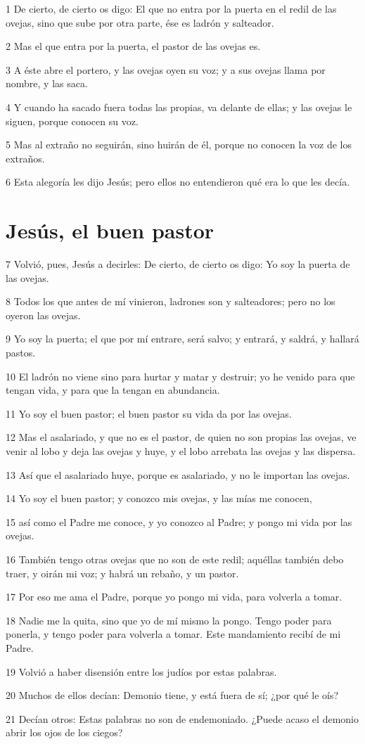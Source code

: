 \par 1 De cierto, de cierto os digo: El que no entra por la puerta en el redil de las ovejas, sino que sube por otra parte, ése es ladrón y salteador.
\par 2 Mas el que entra por la puerta, el pastor de las ovejas es.
\par 3 A éste abre el portero, y las ovejas oyen su voz; y a sus ovejas llama por nombre, y las saca.
\par 4 Y cuando ha sacado fuera todas las propias, va delante de ellas; y las ovejas le siguen, porque conocen su voz.
\par 5 Mas al extraño no seguirán, sino huirán de él, porque no conocen la voz de los extraños.
\par 6 Esta alegoría les dijo Jesús; pero ellos no entendieron qué era lo que les decía.

\section*{Jesús, el buen pastor}

\par 7 Volvió, pues, Jesús a decirles: De cierto, de cierto os digo: Yo soy la puerta de las ovejas.
\par 8 Todos los que antes de mí vinieron, ladrones son y salteadores; pero no los oyeron las ovejas.
\par 9 Yo soy la puerta; el que por mí entrare, será salvo; y entrará, y saldrá, y hallará pastos.
\par 10 El ladrón no viene sino para hurtar y matar y destruir; yo he venido para que tengan vida, y para que la tengan en abundancia.
\par 11 Yo soy el buen pastor; el buen pastor su vida da por las ovejas.
\par 12 Mas el asalariado, y que no es el pastor, de quien no son propias las ovejas, ve venir al lobo y deja las ovejas y huye, y el lobo arrebata las ovejas y las dispersa.
\par 13 Así que el asalariado huye, porque es asalariado, y no le importan las ovejas.
\par 14 Yo soy el buen pastor; y conozco mis ovejas, y las mías me conocen,
\par 15 así como el Padre me conoce, y yo conozco al Padre; y pongo mi vida por las ovejas.
\par 16 También tengo otras ovejas que no son de este redil; aquéllas también debo traer, y oirán mi voz; y habrá un rebaño, y un pastor.
\par 17 Por eso me ama el Padre, porque yo pongo mi vida, para volverla a tomar.
\par 18 Nadie me la quita, sino que yo de mí mismo la pongo. Tengo poder para ponerla, y tengo poder para volverla a tomar. Este mandamiento recibí de mi Padre.
\par 19 Volvió a haber disensión entre los judíos por estas palabras.
\par 20 Muchos de ellos decían: Demonio tiene, y está fuera de sí; ¿por qué le oís?
\par 21 Decían otros: Estas palabras no son de endemoniado. ¿Puede acaso el demonio abrir los ojos de los ciegos?

